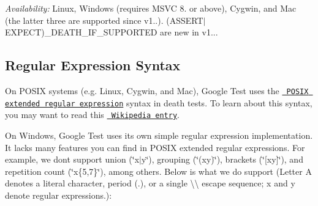 {\itshape Availability\+:} Linux, Windows (requires M\+S\+VC 8. or above), Cygwin, and Mac (the latter three are supported since v1..). {\ttfamily (A\+S\+S\+E\+R\+T$\vert$\+E\+X\+P\+E\+CT)\+\_\+\+D\+E\+A\+T\+H\+\_\+\+I\+F\+\_\+\+S\+U\+P\+P\+O\+R\+T\+ED} are new in v1...

\subsection*{Regular Expression Syntax}

On P\+O\+S\+IX systems (e.\+g. Linux, Cygwin, and Mac), Google Test uses the \href{http://www.opengroup.org/onlinepubs/009695399/basedefs/xbd_chap09.html#tag_09_04}\texttt{ P\+O\+S\+IX extended regular expression} syntax in death tests. To learn about this syntax, you may want to read this \href{http://en.wikipedia.org/wiki/Regular_expression#POSIX_Extended_Regular_Expressions}\texttt{ Wikipedia entry}.

On Windows, Google Test uses its own simple regular expression implementation. It lacks many features you can find in P\+O\+S\+IX extended regular expressions. For example, we don\textquotesingle{}t support union ({\ttfamily \char`\"{}x$\vert$y\char`\"{}}), grouping ({\ttfamily \char`\"{}(xy)\char`\"{}}), brackets ({\ttfamily \char`\"{}\mbox{[}xy\mbox{]}\char`\"{}}), and repetition count ({\ttfamily \char`\"{}x\{5,7\}\char`\"{}}), among others. Below is what we do support (Letter {\ttfamily A} denotes a literal character, period ({\ttfamily .}), or a single {\ttfamily \textbackslash{}\textbackslash{}} escape sequence; {\ttfamily x} and {\ttfamily y} denote regular expressions.)\+:

